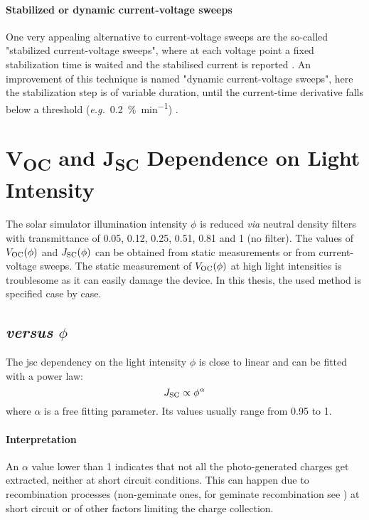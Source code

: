 	\paragraph{Stabilized or dynamic current-voltage sweeps}
	One very appealing alternative to current-voltage sweeps are the so-called "stabilized current-voltage sweeps", where at each voltage point a fixed stabilization time is waited and the stabilised current is reported \cite{Unger2014, Christoforo2015}.
	An improvement of this technique is named "dynamic current-voltage sweeps", here the stabilization step is of variable duration, until the current\hyp{}time derivative falls below a threshold (\textsl{e.g.}\ \SI{0.2}{\%\per\minute}) \cite{Dunbar2017,Dunbar2017a}.


\section{V\textsubscript{OC} and J\textsubscript{SC} Dependence on Light Intensity}
	The solar simulator illumination intensity $\phi$ is reduced \textsl{via} neutral density filters with transmittance of 0.05, 0.12, 0.25, 0.51, 0.81 and 1 (no filter).
	The values of $V_\mathrm{OC}(\phi)$ and $J_\mathrm{SC}(\phi)$ can be obtained from static measurements or from current-voltage sweeps.
	The static measurement of $V_\mathrm{OC}(\phi)$ at high light intensities is troublesome as it can easily damage the device.
	In this thesis, the used method is specified case by case.

	\subsection{ \textsl{versus} $\phi$}\label{jsc-phi}
		The \gls{jsc} dependency on the light intensity $\phi$ is close to linear and can be fitted with a power law:
		\begin{equation} \label{eq:jsc-phi}
			J_\mathrm{SC} \propto \phi^\alpha
		\end{equation}
		where $\alpha$ is a free fitting parameter. Its values usually range from 0.95 to 1.

		\paragraph{Interpretation}
		An $\alpha$ value lower than 1 indicates that not all the photo\hyp{}generated charges get extracted, neither at short circuit conditions.
		This can happen due to recombination processes (non-geminate ones, for geminate recombination see ) at short circuit \cite{Credgington2011} or of other factors limiting the charge collection.

